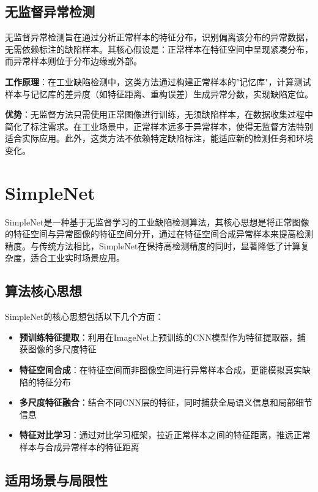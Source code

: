 \documentclass[
  ]{njuthesis}
\begin{document}
\subsection{无监督异常检测}

无监督异常检测旨在通过分析正常样本的特征分布，识别偏离该分布的异常数据，无需依赖标注的缺陷样本。其核心假设是：正常样本在特征空间中呈现紧凑分布，而异常样本则位于分布边缘或外部。

\textbf{工作原理}：在工业缺陷检测中，这类方法通过构建正常样本的"记忆库"，计算测试样本与记忆库的差异度（如特征距离、重构误差）生成异常分数，实现缺陷定位。

\textbf{优势}：无监督方法只需使用正常图像进行训练，无须缺陷样本，在数据收集过程中简化了标注需求。在工业场景中，正常样本远多于异常样本，使得无监督方法特别适合实际应用。此外，这类方法不依赖特定缺陷标注，能适应新的检测任务和环境变化。

\section{SimpleNet}

SimpleNet是一种基于无监督学习的工业缺陷检测算法，其核心思想是将正常图像的特征空间与异常图像的特征空间分开，通过在特征空间合成异常样本来提高检测精度。与传统方法相比，SimpleNet在保持高检测精度的同时，显著降低了计算复杂度，适合工业实时场景应用。

\subsection{算法核心思想}

SimpleNet的核心思想包括以下几个方面：
\begin{itemize}
    \item \textbf{预训练特征提取}：利用在ImageNet上预训练的CNN模型作为特征提取器，捕获图像的多尺度特征
    \item \textbf{特征空间合成}：在特征空间而非图像空间进行异常样本合成，更能模拟真实缺陷的特征分布
    \item \textbf{多尺度特征融合}：结合不同CNN层的特征，同时捕获全局语义信息和局部细节信息
    \item \textbf{特征对比学习}：通过对比学习框架，拉近正常样本之间的特征距离，推远正常样本与合成异常样本的特征距离
\end{itemize}

\subsection{适用场景与局限性}
\end{document}
